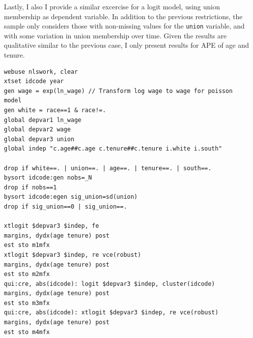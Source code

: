 \documentclass[bib]{statapress}
\begin{document}
\begin{table}[H]

\caption{\label{tbl-mfx1}Comparison of Poisson models: APE}


\end{table}%

Lastly, I also I provide a similar excercise for a logit model, using
union membership as dependent variable. In addition to the previous
restrictions, the sample only considers those with non-missing values
for the \texttt{union} variable, and with some variation in union
membership over time. Given the results are qualitative similar to the
previous case, I only present results for APE of age and tenure.

\begin{verbatim}
webuse nlswork, clear
xtset idcode year
gen wage = exp(ln_wage) // Transform log wage to wage for poisson model
gen white = race==1 & race!=.
global depvar1 ln_wage
global depvar2 wage
global depvar3 union
global indep "c.age##c.age c.tenure##c.tenure i.white i.south"

drop if white==. | union==. | age==. | tenure==. | south==.
bysort idcode:gen nobs=_N
drop if nobs==1     
bysort idcode:egen sig_union=sd(union)
drop if sig_union==0 | sig_union==.

xtlogit $depvar3 $indep, fe  
margins, dydx(age tenure) post
est sto m1mfx
xtlogit $depvar3 $indep, re vce(robust)
margins, dydx(age tenure) post
est sto m2mfx
qui:cre, abs(idcode): logit $depvar3 $indep, cluster(idcode)
margins, dydx(age tenure) post
est sto m3mfx
qui:cre, abs(idcode): xtlogit $depvar3 $indep, re vce(robust) 
margins, dydx(age tenure) post
est sto m4mfx
\end{verbatim}
\end{document}
